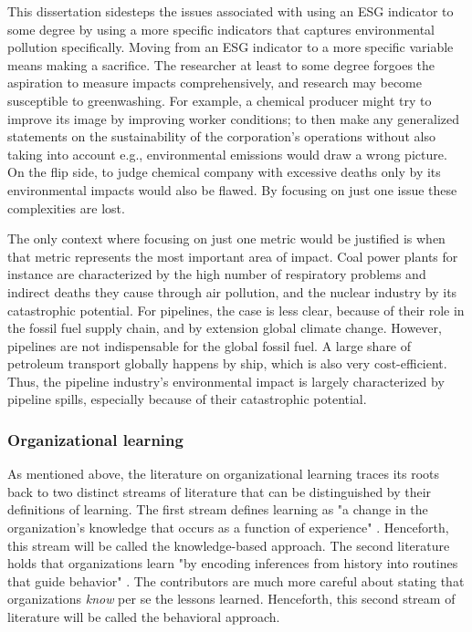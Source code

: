 This dissertation sidesteps the issues associated with using an ESG indicator to some degree by using a more specific indicators that captures environmental pollution specifically. Moving from an ESG indicator to a more specific variable means making a sacrifice. The researcher at least to some degree forgoes the aspiration to measure impacts comprehensively, and research may become susceptible to greenwashing. For example, a chemical producer might try to improve its image by improving worker conditions; to then make any generalized statements on the sustainability of the corporation's operations without also taking into account e.g., environmental emissions would draw a wrong picture. On the flip side, to judge chemical company with excessive deaths only by its environmental impacts would also be flawed. By focusing on just one issue these complexities are lost.

The only context where focusing on just one metric would be justified is when that metric represents the most important area of impact. Coal power plants for instance are characterized by the high number of respiratory problems and indirect deaths they cause through air pollution, and the nuclear industry by its catastrophic potential. For pipelines, the case is less clear, because of their role in the fossil fuel supply chain, and by extension global climate change. However, pipelines are not indispensable for the global fossil fuel. A large share of petroleum transport globally happens by ship, which is also very cost-efficient. Thus, the pipeline industry's environmental impact is largely characterized by pipeline spills, especially because of their catastrophic potential.

\subsubsection{Organizational learning}

As mentioned above, the literature on organizational learning traces its roots back to two distinct streams of literature that can be distinguished by their definitions of learning. The first stream defines learning as "a change in the organization's knowledge that occurs as a function of experience" \citep[p. 1124]{Argote2011}. Henceforth, this stream will be called the knowledge-based approach. The second literature holds that organizations learn "by encoding inferences from history into routines that guide behavior" \citep[p. 320]{Levitt1988}. The contributors are much more careful about stating that organizations \textit{know} per se the lessons learned. Henceforth, this second stream of literature will be called the behavioral approach.

